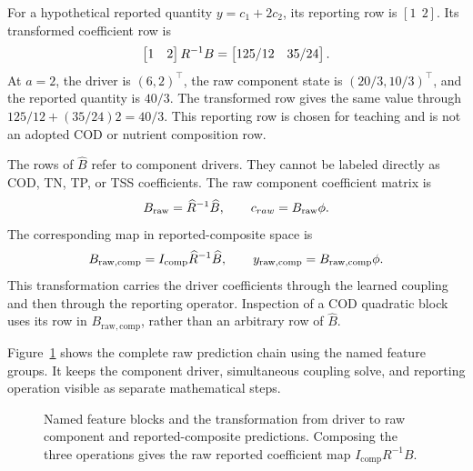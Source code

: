 For a hypothetical reported quantity \(y=c_1+2c_2\), its reporting row is \([1\ \ 2]\). Its transformed coefficient row is
\begin{equation}
\equationname{Illustrative composite coefficients after coupling}
\label{eq:icsor_small_composite_projection}
\begin{bmatrix}1&2\end{bmatrix}R^{-1}B
=\begin{bmatrix}125/12&35/24\end{bmatrix}.
\end{equation}
At \(a=2\), the driver is \((6,2)^\top\), the raw component state is \((20/3,10/3)^\top\), and the reported quantity is \(40/3\). The transformed row gives the same value through \(125/12+(35/24)2=40/3\). This reporting row is chosen for teaching and is not an adopted COD or nutrient composition row.

The rows of \(\widehat B\) refer to component drivers. They cannot be labeled directly as COD, TN, TP, or TSS coefficients. The raw component coefficient matrix is
\begin{equation}
\equationname{Raw component-response coefficients after coupling}
\label{eq:icsor_raw_component_coefficients}
B_{\mathrm{raw}}=\widehat R^{-1}\widehat B,
\qquad c_{raw}=B_{\mathrm{raw}}\phi.
\end{equation}
The corresponding map in reported-composite space is
\begin{equation}
\equationname{Raw composite-response coefficients after coupling and reporting}
\label{eq:icsor_raw_composite_coefficients}
B_{\mathrm{raw,comp}}=I_{\mathrm{comp}}\widehat R^{-1}\widehat B,
\qquad y_{\mathrm{raw,comp}}=B_{\mathrm{raw,comp}}\phi.
\end{equation}
This transformation carries the driver coefficients through the learned coupling and then through the reporting operator. Inspection of a COD quadratic block uses its row in \(B_{\mathrm{raw,comp}}\), rather than an arbitrary row of \(\widehat B\).

Figure~\ref{fig:ch5_prediction_chain} shows the complete raw prediction chain using the named feature groups. It keeps the component driver, simultaneous coupling solve, and reporting operation visible as separate mathematical steps.

\begin{figure}[htbp]
\centering

\caption{Named feature blocks and the transformation from driver to raw component and reported-composite predictions. Composing the three operations gives the raw reported coefficient map \(I_{\mathrm{comp}}R^{-1}B\).}
\label{fig:ch5_prediction_chain}
\end{figure}


